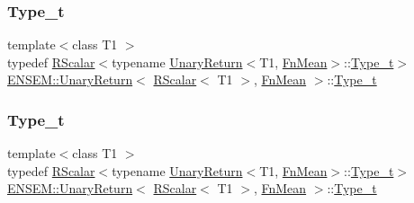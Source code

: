 \subsubsection{\texorpdfstring{Type\_t}{Type\_t}\hspace{0.1cm}{\footnotesize\ttfamily [1/3]}}
{\footnotesize\ttfamily template$<$class T1 $>$ \\
typedef \mbox{\hyperlink{classENSEM_1_1RScalar}{R\+Scalar}}$<$typename \mbox{\hyperlink{structENSEM_1_1UnaryReturn}{Unary\+Return}}$<$T1, \mbox{\hyperlink{structENSEM_1_1FnMean}{Fn\+Mean}}$>$\+::\mbox{\hyperlink{structENSEM_1_1UnaryReturn_3_01RScalar_3_01T1_01_4_00_01FnMean_01_4_a16f842b2df05b5909c08ddde22ca69f8}{Type\+\_\+t}}$>$ \mbox{\hyperlink{structENSEM_1_1UnaryReturn}{E\+N\+S\+E\+M\+::\+Unary\+Return}}$<$ \mbox{\hyperlink{classENSEM_1_1RScalar}{R\+Scalar}}$<$ T1 $>$, \mbox{\hyperlink{structENSEM_1_1FnMean}{Fn\+Mean}} $>$\+::\mbox{\hyperlink{structENSEM_1_1UnaryReturn_3_01RScalar_3_01T1_01_4_00_01FnMean_01_4_a16f842b2df05b5909c08ddde22ca69f8}{Type\+\_\+t}}}

\mbox{\label{structENSEM_1_1UnaryReturn_3_01RScalar_3_01T1_01_4_00_01FnMean_01_4_a16f842b2df05b5909c08ddde22ca69f8}} 
\subsubsection{\texorpdfstring{Type\_t}{Type\_t}\hspace{0.1cm}{\footnotesize\ttfamily [2/3]}}
{\footnotesize\ttfamily template$<$class T1 $>$ \\
typedef \mbox{\hyperlink{classENSEM_1_1RScalar}{R\+Scalar}}$<$typename \mbox{\hyperlink{structENSEM_1_1UnaryReturn}{Unary\+Return}}$<$T1, \mbox{\hyperlink{structENSEM_1_1FnMean}{Fn\+Mean}}$>$\+::\mbox{\hyperlink{structENSEM_1_1UnaryReturn_3_01RScalar_3_01T1_01_4_00_01FnMean_01_4_a16f842b2df05b5909c08ddde22ca69f8}{Type\+\_\+t}}$>$ \mbox{\hyperlink{structENSEM_1_1UnaryReturn}{E\+N\+S\+E\+M\+::\+Unary\+Return}}$<$ \mbox{\hyperlink{classENSEM_1_1RScalar}{R\+Scalar}}$<$ T1 $>$, \mbox{\hyperlink{structENSEM_1_1FnMean}{Fn\+Mean}} $>$\+::\mbox{\hyperlink{structENSEM_1_1UnaryReturn_3_01RScalar_3_01T1_01_4_00_01FnMean_01_4_a16f842b2df05b5909c08ddde22ca69f8}{Type\+\_\+t}}}

